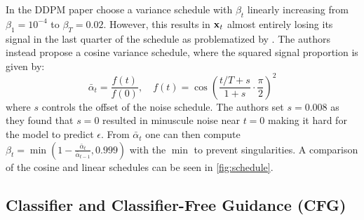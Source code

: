 In the DDPM paper \cite{ho2020denoising} choose a variance schedule with $\beta_t$ linearly increasing from $\beta_1 = 10^{-4}$ to $\beta_T = 0.02$. However, this results in $\boldsymbol{\mathbf{x}}_t$ almost entirely losing its signal in the last quarter of the schedule as problematized by \cite{pmlrv139nichol21a}. The authors instead propose a cosine variance schedule, where the squared signal proportion is given by:
\begin{equation}
    \bar{\alpha}_t=\frac{f(t)}{f(0)}, \quad f(t)=\cos \left(\frac{t / T+s}{1+s} \cdot \frac{\pi}{2}\right)^2
\end{equation}
where $s$ controls the offset of the noise schedule. The authors set $s=0.008$ as they found that $s=0$ resulted in minuscule noise near $t=0$ making it hard for the model to predict $\epsilon$. From $\bar{\alpha}_t$ one can then compute $\beta_t = \min\left( 1 - \frac{\bar{\alpha}_t}{\bar{\alpha}_{t-1}}, 0.999 \right)$ with the $\min$ to prevent singularities. A comparison of the cosine and linear schedules can be seen in \cref{fig:schedule}. 


\subsection{Classifier and Classifier-Free Guidance (CFG)}



